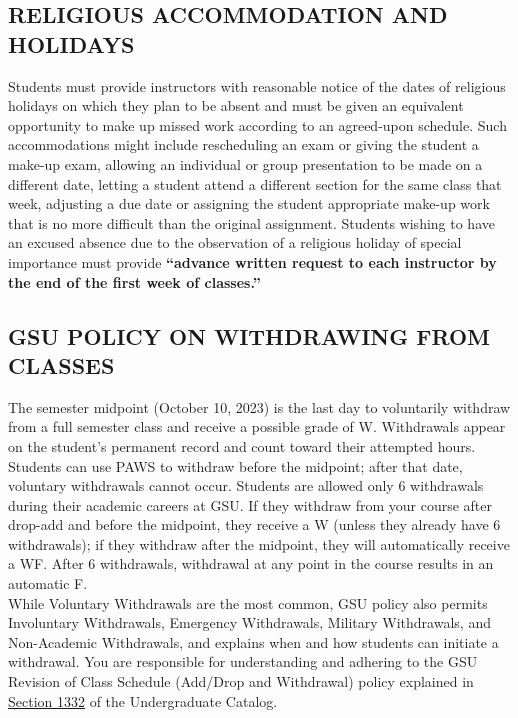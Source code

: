 \documentclass{article}
\begin{document}
\subsection{RELIGIOUS ACCOMMODATION AND HOLIDAYS}
Students must provide instructors with reasonable notice of the dates of religious holidays on which they plan to be absent and must be given an equivalent opportunity to make up missed work according to an agreed-upon schedule. Such accommodations might include rescheduling an exam or giving the student a make-up exam, allowing an individual or group presentation to be made on a different date, letting a student attend a different section for the same class that week, adjusting a due date or assigning the student appropriate make-up work that is no more difficult than the original assignment. Students wishing to have an excused absence due to the observation of a religious holiday of special importance must provide \textbf{“advance written request to each instructor by the end of the first week of classes.”}

\subsection{GSU POLICY ON WITHDRAWING FROM CLASSES}
The semester midpoint (October 10, 2023) is the last day to voluntarily withdraw from a full semester class and receive a possible grade of W.  Withdrawals appear on the student’s permanent record and count toward their attempted hours.  
\\
Students can use PAWS to withdraw before the midpoint; after that date, voluntary withdrawals cannot occur.  Students are allowed only 6 withdrawals during their academic careers at GSU. If they withdraw from your course after drop-add and before the midpoint, they receive a W (unless they already have 6 withdrawals); if they withdraw after the midpoint, they will automatically receive a WF.   After 6 withdrawals, withdrawal at any point in the course results in an automatic F. 
\\
While Voluntary Withdrawals are the most common, GSU policy also permits Involuntary Withdrawals, Emergency Withdrawals, Military Withdrawals, and Non-Academic Withdrawals, and explains when and how students can initiate a withdrawal.   You are responsible for understanding and adhering to the GSU Revision of Class Schedule (Add/Drop and Withdrawal) policy explained in \href{https://catalogs.gsu.edu/content.php?catoid=13&navoid=1563}{Section 1332} of the Undergraduate Catalog.  
\end{document}
